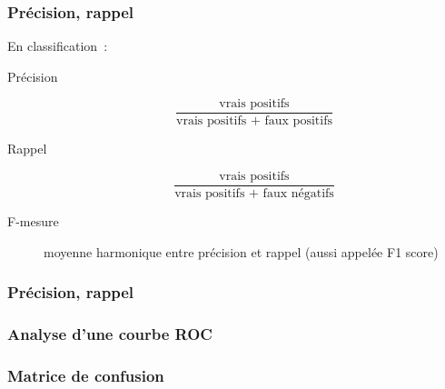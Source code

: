 \begin{frame}
  \frametitle{Précision, rappel}
  En classification :
  \begin{description}
  \item[Précision]
    \[
    \frac{\text{vrais positifs}}{\text{vrais positifs + faux positifs}}
    \]
  \item[Rappel]
    \[
    \frac{\text{vrais positifs}}{\text{vrais positifs + faux négatifs}}
  \]
  \item[F-mesure] moyenne harmonique entre précision et rappel (aussi
    appelée F1 score)
  \end{description}
\end{frame}

\begin{frame}
  \frametitle{Précision, rappel}
\end{frame}

\begin{frame}
  \frametitle{Analyse d'une courbe ROC}
\end{frame}

\begin{frame}
  \frametitle{Matrice de confusion}
\end{frame}
